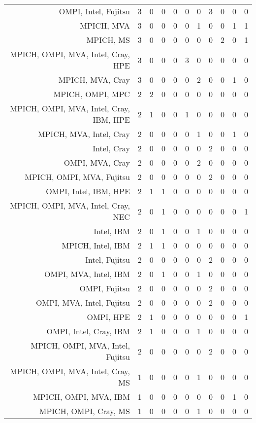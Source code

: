 {\begin{landscape}
\begin{longtable}[htb]{r|c|c|c|c|c|c|c|c|c|c}
{OMPI, Intel, Fujitsu} & 3 & 0 & 0 & 0 & 0 & 0 & 3 & 0 & 0 & 0 \\%
{MPICH, MVA} & 3 & 0 & 0 & 0 & 0 & 1 & 0 & 0 & 1 & 1 \\%
{MPICH, MS} & 3 & 0 & 0 & 0 & 0 & 0 & 0 & 2 & 0 & 1 \\%
{MPICH, OMPI, MVA, Intel, Cray, HPE} & 3 & 0 & 0 & 0 & 3 & 0 & 0 & 0 & 0 & 0 \\%
{MPICH, MVA, Cray} & 3 & 0 & 0 & 0 & 0 & 2 & 0 & 0 & 1 & 0 \\%
{MPICH, OMPI, MPC} & 2 & 2 & 0 & 0 & 0 & 0 & 0 & 0 & 0 & 0 \\%
{MPICH, OMPI, MVA, Intel, Cray, IBM, HPE} & 2 & 1 & 0 & 0 & 1 & 0 & 0 & 0 & 0 & 0 \\%
{MPICH, MVA, Intel, Cray} & 2 & 0 & 0 & 0 & 0 & 1 & 0 & 0 & 1 & 0 \\%
{Intel, Cray} & 2 & 0 & 0 & 0 & 0 & 0 & 2 & 0 & 0 & 0 \\%
{OMPI, MVA, Cray} & 2 & 0 & 0 & 0 & 0 & 2 & 0 & 0 & 0 & 0 \\%
{MPICH, OMPI, MVA, Fujitsu} & 2 & 0 & 0 & 0 & 0 & 0 & 2 & 0 & 0 & 0 \\%
{OMPI, Intel, IBM, HPE} & 2 & 1 & 1 & 0 & 0 & 0 & 0 & 0 & 0 & 0 \\%
{MPICH, OMPI, MVA, Intel, Cray, NEC} & 2 & 0 & 1 & 0 & 0 & 0 & 0 & 0 & 0 & 1 \\%
{Intel, IBM} & 2 & 0 & 1 & 0 & 0 & 1 & 0 & 0 & 0 & 0 \\%
{MPICH, Intel, IBM} & 2 & 1 & 1 & 0 & 0 & 0 & 0 & 0 & 0 & 0 \\%
{Intel, Fujitsu} & 2 & 0 & 0 & 0 & 0 & 0 & 2 & 0 & 0 & 0 \\%
{OMPI, MVA, Intel, IBM} & 2 & 0 & 1 & 0 & 0 & 1 & 0 & 0 & 0 & 0 \\%
{OMPI, Fujitsu} & 2 & 0 & 0 & 0 & 0 & 0 & 2 & 0 & 0 & 0 \\%
{OMPI, MVA, Intel, Fujitsu} & 2 & 0 & 0 & 0 & 0 & 0 & 2 & 0 & 0 & 0 \\%
{OMPI, HPE} & 2 & 1 & 0 & 0 & 0 & 0 & 0 & 0 & 0 & 1 \\%
{OMPI, Intel, Cray, IBM} & 2 & 1 & 0 & 0 & 0 & 1 & 0 & 0 & 0 & 0 \\%
{MPICH, OMPI, MVA, Intel, Fujitsu} & 2 & 0 & 0 & 0 & 0 & 0 & 2 & 0 & 0 & 0 \\%
{MPICH, OMPI, MVA, Intel, Cray, MS} & 1 & 0 & 0 & 0 & 0 & 1 & 0 & 0 & 0 & 0 \\%
{MPICH, OMPI, MVA, IBM} & 1 & 0 & 0 & 0 & 0 & 0 & 0 & 0 & 1 & 0 \\%
{MPICH, OMPI, Cray, MS} & 1 & 0 & 0 & 0 & 0 & 1 & 0 & 0 & 0 & 0 \\%

\end{longtable}
\end{landscape}}
